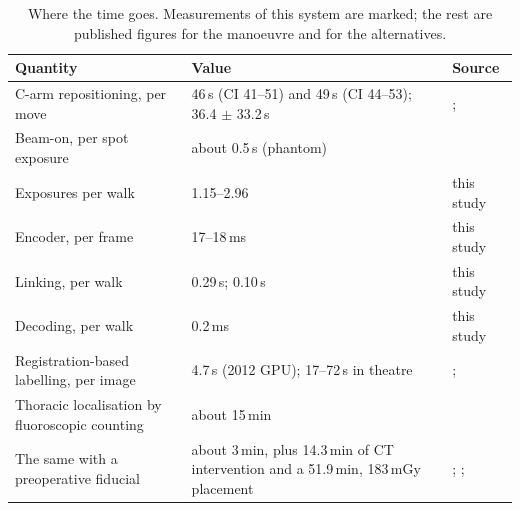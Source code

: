 \documentclass[11pt,letterpaper]{article}
\begin{document}
\begin{table}[htbp]\centering
\caption{The same cases under three box conditions. The count is unchanged; only the source of the
vertebra boxes differs. The render-trained detector loses the anchor, and every ordinal above it shifts.}
\label{tab:boxes}
\small
{}
\end{table}

\begin{table}[htbp]\centering
\caption{Where the time goes. Measurements of this system are marked; the rest are published figures for
the manoeuvre and for the alternatives.}
\label{tab:time}
\small
\begin{tabular}{p{7.6cm}p{4.0cm}p{3.4cm}}
\toprule
Quantity & Value & Source \\
\midrule
C-arm repositioning, per move & 46\,s (CI 41--51) and 49\,s (CI 44--53); 36.4 $\pm$ 33.2\,s &
\citet{matthews2007}; \citet{desilva2018} \\
Beam-on, per spot exposure & about 0.5\,s (phantom) & \citet{desilva2018} \\
Exposures per walk & 1.15--2.96 & this study \\
Encoder, per frame & 17--18\,ms & this study \\
Linking, per walk & 0.29\,s; 0.10\,s & this study \\
Decoding, per walk & 0.2\,ms & this study \\
Registration-based labelling, per image & 4.7\,s (2012 GPU); 17--72\,s in theatre &
\citet{levelcheck2012}; \citet{manbachi2018} \\
Thoracic localisation by fluoroscopic counting & about 15\,min & \citet{mongardi2021,upadhyaya2012} \\
The same with a preoperative fiducial & about 3\,min, plus 14.3\,min of CT intervention and a 51.9\,min,
183\,mGy placement & \citet{mongardi2021}; \citet{keil2024}; \citet{siminski2023} \\
\bottomrule
\end{tabular}
\end{table}

\clearpage


\end{document}
